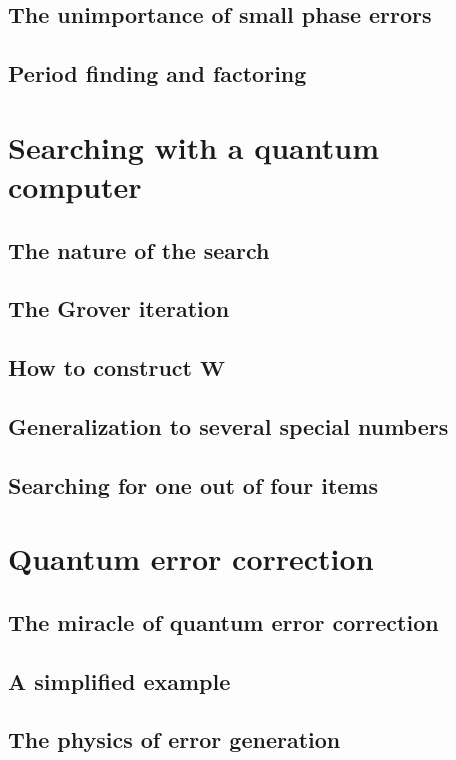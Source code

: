\documentclass{book}
\theoremstyle{definition}
\begin{document}
\subsection{The unimportance of small phase errors}
\subsection{Period finding and factoring}


\newpage

\section{Searching with a quantum computer}

\subsection{The nature of the search}
\subsection{The Grover iteration}
\subsection{How to construct $\mathbf{W}$}
\subsection{Generalization to several special numbers}
\subsection{Searching for one out of four items}


\newpage

\section{Quantum error correction}

\subsection{The miracle of quantum error correction}
\subsection{A simplified example}
\subsection{The physics of error generation}
\end{document}
